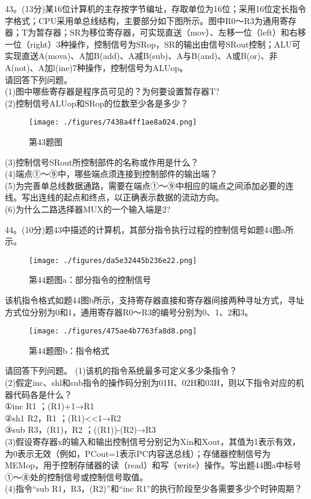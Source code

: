 43。(13分)某16位计算机的主存按字节编址，存取单位为16位；采用16位定长指令字格式；CPU采用单总线结构，主要部分如下图所示。图中R0～R3为通用寄存器；T为暂存器；SR为移位寄存器，可实现直送（mov）、左移一位（left）和右移一位（right）3种操作，控制信号为SRop，SR的输出由信号SRout控制；ALU可实现直送A(mova)、A加B(add)、A减B(sub)、A与B(and)、A或B(or)、非A(not)、A加l(ine)7种操作，控制信号为ALUop。 \\
请回答下列问题。 \\
(1)图中哪些寄存器是程序员可见的？为何要设置暂存器T? \\
(2)控制信号ALUop和SRop的位数至少各是多少？
\begin{figure}[ht]
\centering
\texttt{[image: ./figures/7438a4ff1ae8a024.png]}
\caption{第43题图} \label{fig_CSN15_6}
\end{figure}
(3)控制信号SRout所控制部件的名称或作用是什么？ \\
(4)端点①～⑨中，哪些端点须连接到控制部件的输出端？ \\
(5)为完善单总线数据通路，需要在端点①～⑨中相应的端点之间添加必要的连线。写出连线的起点和终点，以正确表示数据的流动方向。 \\
(6)为什么二路选择器MUX的一个输入端是2?

44。(10分)题43中描述的计算机，其部分指令执行过程的控制信号如题44图a所示。
\begin{figure}[ht]
\centering
\texttt{[image: ./figures/da5e32445b236e22.png]}
\caption{第44题图a：部分指令的控制信号} \label{fig_CSN15_7}
\end{figure}
该机指令格式如题44图b所示，支持寄存器直接和寄存器间接两种寻址方式，寻址方式位分别为0和1，通用寄存器R0～R3的编号分别为0、1、2和3。
\begin{figure}[ht]
\centering
\texttt{[image: ./figures/475ae4b7763fa8d8.png]}
\caption{第44题图b：指令格式} \label{fig_CSN15_8}
\end{figure}
请回答下列问题。
(1)该机的指令系统最多可定义多少条指令？ \\
(2)假定inc、shl和sub指令的操作码分别为01H、02H和03H，则以下指令对应的机器代码各是什么？ \\
①inc R1 ；(R1)+1→R1 \\
②sh1 R2，R1 ；(R1)<<1→R2 \\
③sub R3，(R1)，R2 ；((R1))-(R2)→R3 \\
(3)假设寄存器x的输入和输出控制信号分别记为Xin和Xout，其值为1表示有效，为0表示无效（例如，PCout=1表示PC内容送总线）；存储器控制信号为MEMop，用于控制存储器的读（read）和写（write）操作。写出题44图a中标号①～⑧处的控制信号或控制信号取值。 \\
(4)指令“sub R1，R3，(R2)”和“inc R1”的执行阶段至少各需要多少个时钟周期？


